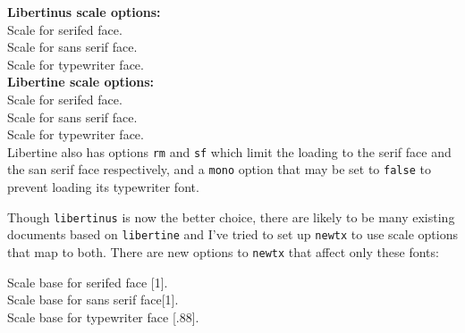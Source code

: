 \documentclass[\fsc]{article}
\theoremstyle{oldplain}
\theoremstyle{plain}
\begin{document}
\hspace*{.5in}\textbf{Libertinus scale options:}\\
\hspace*{.5in}{\tt ScaleRM}\hspace{.5in}Scale for serifed face.\\
\hspace*{.5in}{\tt ScaleSF}\hspace{.5in}Scale for sans serif face.\\
\hspace*{.5in}{\tt ScaleTT}\hspace{.5in}Scale for typewriter face.\\

\hspace*{.5in}\textbf{Libertine scale options:}\\
\hspace*{.5in}{\tt llscale}\hspace{.5in}Scale for serifed face.\\
\hspace*{.5in}{\tt scale}\hspace{.66in}Scale for sans serif face.\\
\hspace*{.5in}{\tt ttscale}\hspace{.5in}Scale for typewriter face.\\

Libertine also has options {\tt rm} and {\tt sf}  which limit the loading to the serif face and the san serif face respectively, and a {\tt mono} option that may be set to {\tt false} to prevent loading its typewriter font.

Though {\tt libertinus} is now the better choice, there are likely to be many existing documents based on {\tt libertine} and I've tried to set up {\tt newtx} to use  scale options that map to both. There are new options to {\tt newtx} that affect only these fonts:

\hspace*{.5in}{\tt ScaleBaseRM}\hspace{.5in}Scale base for serifed face [1].\\
\hspace*{.5in}{\tt ScaleBaseSF}\hspace{.5in}Scale base for sans serif face[1].\\
\hspace*{.5in}{\tt ScaleBaseTT}\hspace{.5in}Scale base for typewriter face [.88].\\
\end{document}
